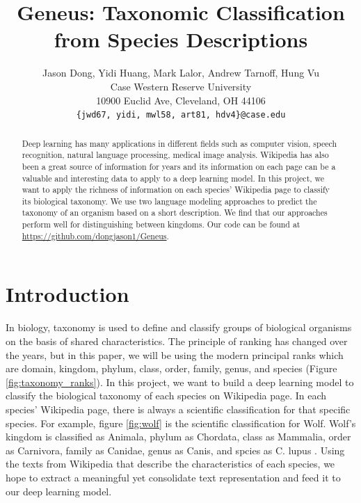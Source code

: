 \documentclass[10pt,twocolumn,letterpaper]{article}
\begin{document}
\title{Geneus: Taxonomic Classification from Species Descriptions}

\author{Jason Dong, Yidi Huang, Mark Lalor, Andrew Tarnoff, Hung Vu \\
Case Western Reserve University\\
10900 Euclid Ave, Cleveland, OH 44106\\
{\tt\small \{jwd67, yidi, mwl58, art81, hdv4\}@case.edu}}

\maketitle

\begin{abstract}
   Deep learning has many applications in different fields such as computer vision, speech recognition, natural language processing, medical image analysis. Wikipedia has also been a great source of information for years and its information on each page can be a valuable and interesting data to apply to a deep learning model. In this project, we want to apply the richness of information on each species’ Wikipedia page to classify its biological taxonomy. We use two language modeling approaches to predict the taxonomy of an organism based on a short description. We find that our approaches perform well for distinguishing between kingdoms. Our code can be found at \url{https://github.com/dongjason1/Geneus}. 
\end{abstract}

\section{Introduction}

    In biology, taxonomy is used to define and classify groups of biological organisms on the basis of shared characteristics. The principle of ranking has changed over the years, but in this paper, we will be using the modern principal ranks which are domain, kingdom, phylum, class, order, family, genus, and species (Figure \ref{fig:taxonomy_ranks}). In this project, we want to build a deep learning model to classify the biological taxonomy of each species on Wikipedia page. In each species’ Wikipedia page, there is always a scientific classification for that specific species. For example, figure \ref{fig:wolf} is the scientific classification for Wolf. Wolf's kingdom is classified as Animala, phylum as Chordata, class as Mammalia, order as Carnivora, family as Canidae, genus as Canis, and spcies as C. lupus . Using the texts from Wikipedia that describe the characteristics of each species, we hope to extract a meaningful yet consolidate text representation and feed it to our deep learning model.
    
\end{document}
